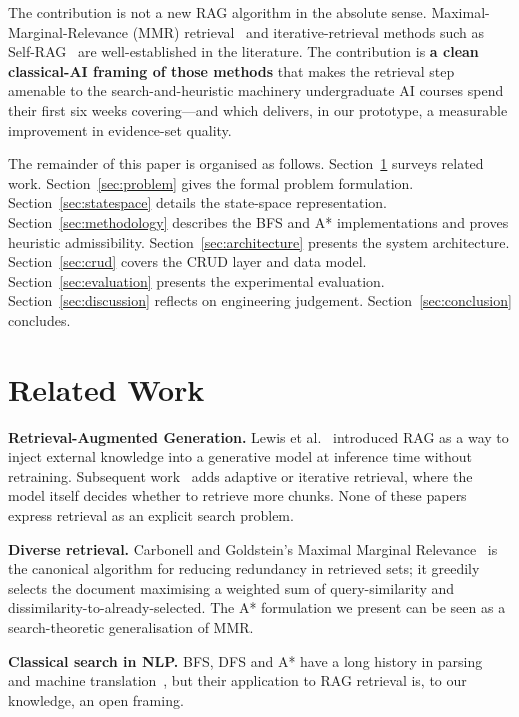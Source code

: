 \documentclass[conference]{IEEEtran}
\begin{document}
The contribution is not a new RAG algorithm in the absolute sense.
Maximal-Marginal-Relevance (MMR) retrieval~\cite{carbonell1998mmr} and
iterative-retrieval methods such as Self-RAG~\cite{asai2024selfrag} are
well-established in the literature. The contribution is \textbf{a clean
classical-AI framing of those methods} that makes the retrieval step amenable
to the search-and-heuristic machinery undergraduate AI courses spend their
first six weeks covering---and which delivers, in our prototype, a measurable
improvement in evidence-set quality.

The remainder of this paper is organised as follows. Section~\ref{sec:related}
surveys related work. Section~\ref{sec:problem} gives the formal problem
formulation. Section~\ref{sec:statespace} details the state-space
representation. Section~\ref{sec:methodology} describes the BFS and A*
implementations and proves heuristic admissibility.
Section~\ref{sec:architecture} presents the system architecture.
Section~\ref{sec:crud} covers the CRUD layer and data model.
Section~\ref{sec:evaluation} presents the experimental evaluation.
Section~\ref{sec:discussion} reflects on engineering judgement.
Section~\ref{sec:conclusion} concludes.

\section{Related Work}
\label{sec:related}

\textbf{Retrieval-Augmented Generation.}
Lewis et al.~\cite{lewis2020rag} introduced RAG as a way to inject external
knowledge into a generative model at inference time without retraining.
Subsequent work~\cite{asai2024selfrag,izacard2021leveraging} adds adaptive or
iterative retrieval, where the model itself decides whether to retrieve more
chunks. None of these papers express retrieval as an explicit search problem.

\textbf{Diverse retrieval.}
Carbonell and Goldstein's Maximal Marginal Relevance~\cite{carbonell1998mmr}
is the canonical algorithm for reducing redundancy in retrieved sets; it
greedily selects the document maximising a weighted sum of query-similarity
and dissimilarity-to-already-selected. The A* formulation we present can be
seen as a search-theoretic generalisation of MMR.

\textbf{Classical search in NLP.}
BFS, DFS and A* have a long history in parsing~\cite{earley1970parsing} and
machine translation~\cite{koehn2010smt}, but their application to RAG
retrieval is, to our knowledge, an open framing.
\end{document}
